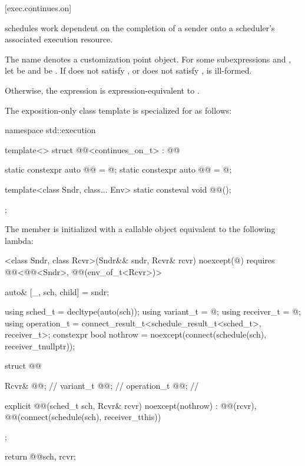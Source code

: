 [exec.continues.on]{}

\pnum
{} schedules work dependent on the completion of a sender
onto a scheduler's associated execution resource.

\pnum
The name  denotes a customization point object.
For some subexpressions  and ,
let  be  and
 be .
If  does not satisfy , or
 does not satisfy ,
 is ill-formed.

\pnum
Otherwise,
the expression  is expression-equivalent to
.

\pnum
The exposition-only class template 
is specialized for  as follows:
%
\begin{codeblock}
namespace std::execution {
  template<>
  struct @@<continues_on_t> : @@ {
    static constexpr auto @@ = @\seebelow@;
    static constexpr auto @@ = @\seebelow@;

    template<class Sndr, class... Env>
      static consteval void @@();
  };
}
\end{codeblock}

\pnum
The member 
is initialized with a callable object equivalent to the following lambda:
\begin{codeblock}
[]<class Sndr, class Rcvr>(Sndr&& sndr, Rcvr& rcvr) noexcept(@\seebelow@)
    requires @@<@@<Sndr>, @@(env_of_t<Rcvr>)> {
  auto& [_, sch, child] = sndr;

  using sched_t = decltype(auto(sch));
  using variant_t = @\seebelow@;
  using receiver_t = @\seebelow@;
  using operation_t = connect_result_t<schedule_result_t<sched_t>, receiver_t>;
  constexpr bool nothrow = noexcept(connect(schedule(sch), receiver_t{nullptr}));

  struct @@ {
    Rcvr& @@;                 // \expos
    variant_t @@;     // \expos
    operation_t @@;       // \expos

    explicit @@(sched_t sch, Rcvr& rcvr) noexcept(nothrow)
      : @@(rcvr), @@(connect(schedule(sch), receiver_t{this})) {}
  };

  return @@{sch, rcvr};
}
\end{codeblock}

